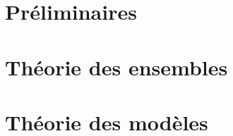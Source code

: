 \documentclass[11pt, a4paper, french]{book}
\begin{document}
	
	
	
	
	
	
	
	\mainmatter
	
	
	
	\part{Préliminaires}
	
	

	

        

        

        


        \part{Théorie des ensembles}

        

        
	
	
	\part{Théorie des modèles}
	
	
	
	
	
	
	\backmatter
	
	
	
	
	
	
	
	\printbibliography[%
		heading = bibintoc,%
	]
	
	
	
	\printindex
	\printindex[notation]
	\printindex[person]
	
	
	
\end{document}
